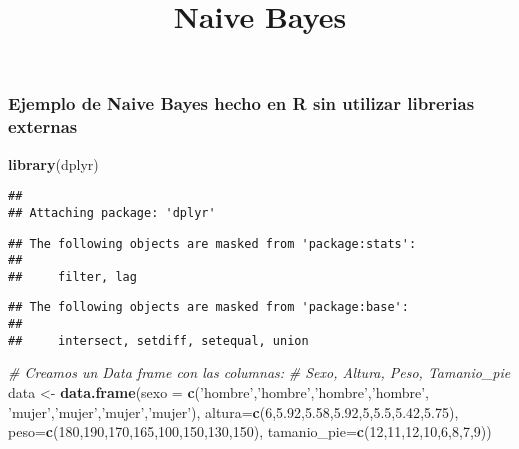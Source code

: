 \documentclass[]{article}
\title{Naive Bayes}
\author{}
\date{}
\newenvironment{Shaded}{\begin{snugshade}}{\end{snugshade}}
\newcommand{\KeywordTok}[1]{\textcolor[rgb]{0.13,0.29,0.53}{\textbf{#1}}}
\newcommand{\DataTypeTok}[1]{\textcolor[rgb]{0.13,0.29,0.53}{#1}}
\newcommand{\DecValTok}[1]{\textcolor[rgb]{0.00,0.00,0.81}{#1}}
\newcommand{\FloatTok}[1]{\textcolor[rgb]{0.00,0.00,0.81}{#1}}
\newcommand{\StringTok}[1]{\textcolor[rgb]{0.31,0.60,0.02}{#1}}
\newcommand{\CommentTok}[1]{\textcolor[rgb]{0.56,0.35,0.01}{\textit{#1}}}
\newcommand{\NormalTok}[1]{#1}
\begin{document}
\maketitle

\subsubsection{Ejemplo de Naive Bayes hecho en R sin utilizar librerias
externas}\label{ejemplo-de-naive-bayes-hecho-en-r-sin-utilizar-librerias-externas}

\begin{Shaded}
\begin{Highlighting}[]
\KeywordTok{library}\NormalTok{(dplyr)}
\end{Highlighting}
\end{Shaded}

\begin{verbatim}
## 
## Attaching package: 'dplyr'
\end{verbatim}

\begin{verbatim}
## The following objects are masked from 'package:stats':
## 
##     filter, lag
\end{verbatim}

\begin{verbatim}
## The following objects are masked from 'package:base':
## 
##     intersect, setdiff, setequal, union
\end{verbatim}

\begin{Shaded}
\begin{Highlighting}[]
\CommentTok{# Creamos un Data frame con las columnas:}
\CommentTok{# Sexo, Altura, Peso, Tamanio_pie }
\NormalTok{data <-}\StringTok{  }\KeywordTok{data.frame}\NormalTok{(}\DataTypeTok{sexo =} \KeywordTok{c}\NormalTok{(}\StringTok{'hombre'}\NormalTok{,}\StringTok{'hombre'}\NormalTok{,}\StringTok{'hombre'}\NormalTok{,}\StringTok{'hombre'}\NormalTok{,}
                          \StringTok{'mujer'}\NormalTok{,}\StringTok{'mujer'}\NormalTok{,}\StringTok{'mujer'}\NormalTok{,}\StringTok{'mujer'}\NormalTok{),}
                  \DataTypeTok{altura=}\KeywordTok{c}\NormalTok{(}\DecValTok{6}\NormalTok{,}\FloatTok{5.92}\NormalTok{,}\FloatTok{5.58}\NormalTok{,}\FloatTok{5.92}\NormalTok{,}\DecValTok{5}\NormalTok{,}\FloatTok{5.5}\NormalTok{,}\FloatTok{5.42}\NormalTok{,}\FloatTok{5.75}\NormalTok{),}
                  \DataTypeTok{peso=}\KeywordTok{c}\NormalTok{(}\DecValTok{180}\NormalTok{,}\DecValTok{190}\NormalTok{,}\DecValTok{170}\NormalTok{,}\DecValTok{165}\NormalTok{,}\DecValTok{100}\NormalTok{,}\DecValTok{150}\NormalTok{,}\DecValTok{130}\NormalTok{,}\DecValTok{150}\NormalTok{),}
                  \DataTypeTok{tamanio_pie=}\KeywordTok{c}\NormalTok{(}\DecValTok{12}\NormalTok{,}\DecValTok{11}\NormalTok{,}\DecValTok{12}\NormalTok{,}\DecValTok{10}\NormalTok{,}\DecValTok{6}\NormalTok{,}\DecValTok{8}\NormalTok{,}\DecValTok{7}\NormalTok{,}\DecValTok{9}\NormalTok{))}
\end{Highlighting}
\end{Shaded}
\end{document}
